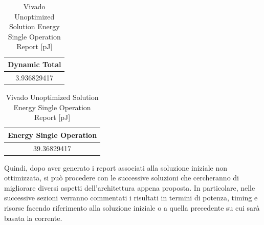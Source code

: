 \begin{table}[H]
    \centering
    \begin{minipage}[t]{0.45\linewidth}
        \centering
        \begin{tabular}{|c|}
            \hline
            \textbf{Dynamic Total} \\
            \hline
            3.936829417 \\
            \hline
        \end{tabular}
        \caption{Vivado Unoptimized Solution Dynamic Power Report [mW]}
        \label{tab:vivado-unoptimized-solution-dynamic-power-reproot}
    \end{minipage}
    \hfill
    \centering
    \begin{minipage}[t]{0.45\linewidth}
        \centering
        \begin{tabular}{|c|}
            \hline
            \textbf{Energy Single Operation} \\
            \hline
            39.36829417 \\
            \hline
        \end{tabular}
        \caption{Vivado Unoptimized Solution Energy Single Operation Report [pJ]}
        \label{tab:vivado-unoptimized-solution-energy-single-operation-reproot}
    \end{minipage}
\end{table}

Quindi, dopo aver generato i report associati alla soluzione iniziale non ottimizzata, si può procedere con le successive soluzioni che cercheranno di migliorare diversi aspetti dell'architettura appena proposta. In particolare, nelle successive sezioni verranno commentati i risultati in termini di potenza, timing e risorse facendo riferimento alla soluzione iniziale o a quella precedente su cui sarà basata la corrente.